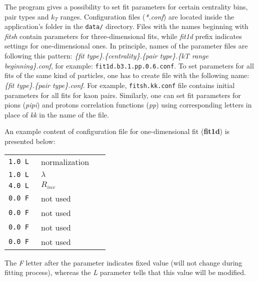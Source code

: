       The program gives a possibility to set fit parameters for certain centrality bins, pair types and $k_T$ ranges.
      Configuration files (\textit{*.conf}) are located inside the application's folder in the \verb|data/| directory.
      Files with the names beginning with \textit{fitsh} contain parameters for three-dimensional fits, while \textit{fit1d} prefix indicates settings for one-dimensional ones.
      In principle, names of the parameter files are following this pattern: \textit{\{fit type\}.\{centrality\}.\{pair type\}.\{kT range beginning\}.conf}, for example: \verb|fit1d.b3.1.pp.0.6.conf|.
      To set parameters for all fits of the same kind of particles, one has to create file with the following name: \textit{\{fit type\}.\{pair type\}.conf}. For example, \verb|fitsh.kk.conf| file contains initial parameters for all fits for kaon pairs.
      Similarly, one can set fit parameters for pions (\textit{pipi}) and protons correlation functions (\textit{pp}) using corresponding letters in place of \textit{kk} in the name of the file.


      An example content of configuration file for one-dimensional fit (\textbf{fit1d}) is presented below:
      \begin{longtable}{p{0.2\linewidth}p{0.2\linewidth}}
        \verb|1.0 L|   & normalization\\
        \verb|1.0 L|   & $\lambda$\\
        \verb|4.0 L|   & $R_{inv}$\\
        \verb|0.0 F|   & not used \\
        \verb|0.0 F|   & not used \\
        \verb|0.0 F|   & not used \\
        \verb|0.0 F|   & not used \\
      \end{longtable}
      The \textit{F} letter after the parameter indicates fixed value (will not change during fitting process), whereas the \textit{L} parameter tells that this value will be modified.

